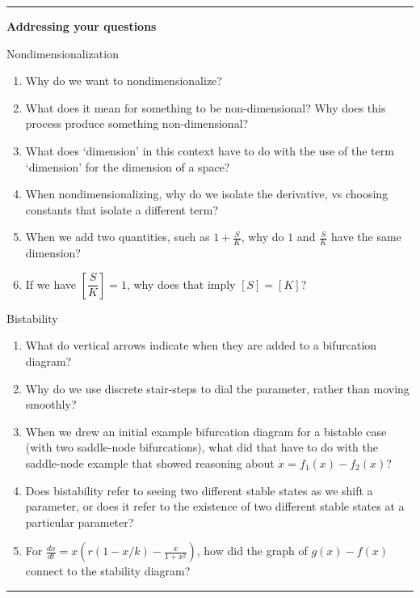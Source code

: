 \documentclass[12pt,letterpaper,noanswers]{exam}
\begin{document}
\eject

\vspace{0.2cm}

\hrule
\vspace{0.2cm}

\noindent\textbf{Addressing your questions}

Nondimensionalization
\begin{enumerate}
\itemsep-0.2em
\item Why do we want to nondimensionalize?
\item What does it mean for something to be non-dimensional?  Why does this process produce something non-dimensional?
\item What does `dimension' in this context have to do with the use of the term `dimension' for the dimension of a space?
\item When nondimensionalizing, why do we isolate the derivative, vs choosing constants that isolate a different term?
\item When we add two quantities, such as $1 + \frac{S}{K}$, why do $1$ and $\frac{S}{K}$ have the same dimension?
\item If we have $\left[\dfrac{S}{K}\right] = 1$, why does that imply $\left[S\right] = \left[K\right]$?
\end{enumerate}

Bistability
\begin{enumerate}
\itemsep-0.2em
\item What do vertical arrows indicate when they are added to a bifurcation diagram?
\item Why do we use discrete stair-steps to dial the parameter, rather than moving smoothly?
\item When we drew an initial example bifurcation diagram for a bistable case (with two saddle-node bifurcations), what did that have to do with the saddle-node example that showed reasoning about $\dot x = f_1(x) - f_2(x)$?
\item Does bistability refer to seeing two different stable states as we shift a parameter, or does it refer to the existence of two different stable states at a particular parameter?
\item For $\frac{dx}{dt} = x\left(r(1-x/k) - \frac{x}{1+x^2}\right)$, how did the graph of $g(x) - f(x)$ connect to the stability diagram?

\end{enumerate}

\vspace{0.2cm}
\hrule
\vspace{0.2cm}
\end{document}

